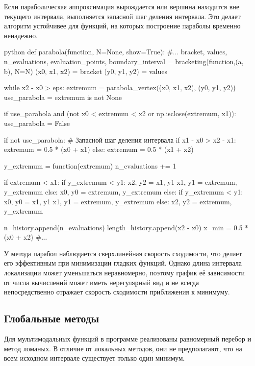 Если параболическая аппроксимация вырождается или вершина находится вне текущего
интервала, выполняется запасной шаг деления интервала. Это делает алгоритм
устойчивее для функций, на которых построение параболы временно ненадежно.

\newpage

\begin{mintedbox}{python}
def parabola(function, N=None, show=True):
    #...
    bracket, values, n_evaluations, evaluation_points, boundary_interval = bracketing(function,(a, b), N=N)
    (x0, x1, x2) = bracket
    (y0, y1, y2) = values

    while x2 - x0 > eps:
        extremum = parabola_vertex((x0, x1, x2), (y0, y1, y2))
        use_parabola = extremum is not None

        if use_parabola and (not x0 < extremum < x2 or np.isclose(extremum, x1)):
            use_parabola = False

        if not use_parabola: # Запасной шаг деления интервала
            if x1 - x0 > x2 - x1:
                extremum = 0.5 * (x0 + x1)
            else:
                extremum = 0.5 * (x1 + x2)

        y_extremum = function(extremum)
        n_evaluations += 1

        if extremum < x1:
            if y_extremum < y1:
                x2, y2 = x1, y1
                x1, y1 = extremum, y_extremum
            else:
                x0, y0 = extremum, y_extremum
        else:
            if y_extremum < y1:
                x0, y0 = x1, y1
                x1, y1 = extremum, y_extremum
            else:
                x2, y2 = extremum, y_extremum

        n_history.append(n_evaluations)
        length_history.append(x2 - x0)
    x_min = 0.5 * (x0 + x2)
    #...
\end{mintedbox}

У метода парабол наблюдается сверхлинейная скорость сходимости, что делает его эффективным при минимизации гладких функций. Однако длина интервала локализации может уменьшаться неравномерно, поэтому график её зависимости от числа вычислений может иметь нерегулярный вид и не всегда непосредственно отражает скорость сходимости приближения к минимуму.

\subsection{Глобальные методы}

Для мультимодальных функций в программе реализованы равномерный перебор
и метод ломаных. В отличие от локальных методов, они не предполагают, что
на всем исходном интервале существует только один минимум.

